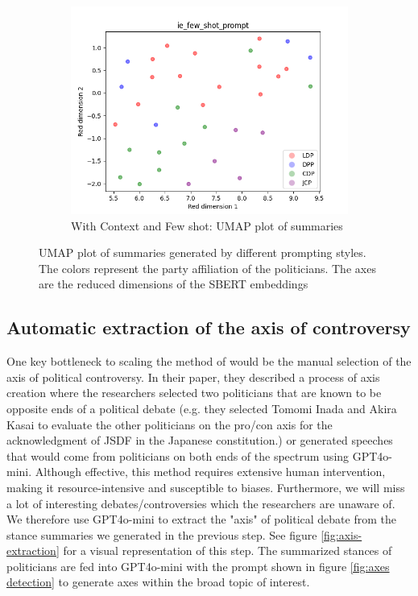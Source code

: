 \documentclass[final,5p,times,twocolumn,authoryear]{elsarticle}
\begin{document}
\begin{figure}[h]
\begin{subfigure}{0.22\textwidth}
  \includegraphics[width=1\linewidth]{figs/ie_few_shot_prompt_umap.png}
  \caption{With Context and Few shot: UMAP plot of summaries}
\end{subfigure}
\caption{UMAP plot of summaries generated by different prompting styles. The colors represent the party affiliation of the politicians. The axes are the reduced dimensions of the SBERT embeddings}
\label{fig:UMAP prompt comparison}
\end{figure}

\subsection{Automatic extraction of the axis of controversy}
\label{section: extraction of axis of controversy}

One key bottleneck to scaling the method of \citeauthor{kato2024lupinllmbasedpoliticalideology} would be the manual selection of the axis of political controversy. In their paper, they described a process of axis creation where the researchers selected two politicians that are known to be opposite ends of a political debate (e.g. they selected Tomomi Inada and Akira Kasai to evaluate the other politicians on the pro/con axis for the acknowledgment of JSDF in the Japanese constitution.) or generated speeches that would come from politicians on both ends of the spectrum using GPT4o-mini. Although effective, this method requires extensive human intervention, making it resource-intensive and susceptible to biases. Furthermore, we will miss a lot of interesting debates/controversies which the researchers are unaware of. We therefore use GPT4o-mini to extract the "axis" of political debate from the stance summaries we generated in the previous step. See figure \ref{fig:axis-extraction} for a visual representation of this step. The summarized stances of politicians are fed into GPT4o-mini with the prompt shown in figure \ref{fig:axes detection} to generate axes within the broad topic of interest. 
\end{document}
